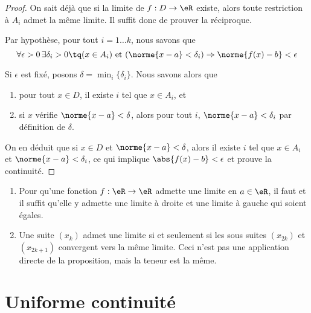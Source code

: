\begin{proof}On sait déjà que si la limite de $f : D \to \eR$
  existe, alors toute restriction à $A_i$ admet la même limite. Il
  suffit donc de prouver la réciproque.

  Par hypothèse, pour tout $i = 1 \ldots k$, nous savons que
  \begin{equation*}
    \forall \epsilon > 0\, \exists \delta_i > 0 \tq (x \in A_i)
    \text{ et }
    (\norme{x-a} < \delta_i) \Rightarrow \norme{f(x) - b} < \epsilon
  \end{equation*}

  Si $\epsilon$ est fixé, posons $\delta = \min_i\{\delta_i\}$. Nous
  savons alors que
  \begin{enumerate}
  \item pour tout $x \in D$, il existe $i$ tel que $x \in A_i$, et
  \item si $x$ vérifie $\norme{x-a} < \delta$, alors pour tout $i$,
    $\norme{x-a} < \delta_i$ par définition de $\delta$.
  \end{enumerate}
  
  On en déduit que si $x \in D$ et $\norme{x-a} < \delta$, alors il
  existe $i$ tel que $x \in A_i$ et $\norme{x-a} < \delta_i$, ce qui
  implique $\abs{f(x) - b} < \epsilon$ et prouve la continuité.
\end{proof}

\begin{example}
  \begin{enumerate}
  \item Pour qu'une fonction $f : \eR \to \eR$ admette une limite en
    $a \in \eR$, il faut et il suffit qu'elle y admette une limite à
    droite et une limite à gauche qui soient égales.

  \item Une suite $(x_k)$ admet une limite si et seulement si les
    sous suites $(x_{2k})$ et $(x_{2k+1})$ convergent vers la même
    limite. Ceci n'est pas une application directe de la proposition,
    mais la teneur est la même.
  \end{enumerate}
\end{example}

\section{Uniforme continuité}		\label{SecUnifContinue}

